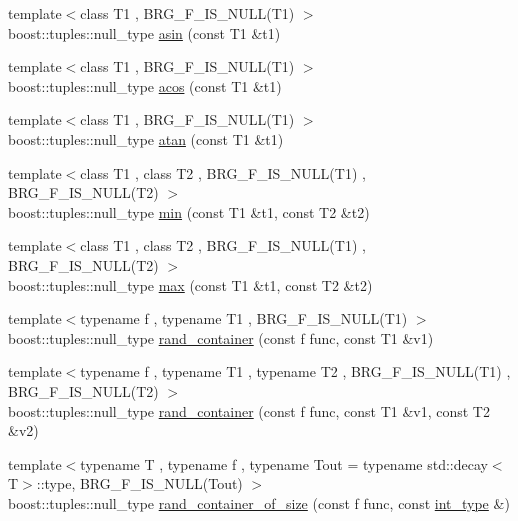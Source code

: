 \begin{DoxyCompactItemize}
\item 
{\footnotesize template$<$class T1 , B\-R\-G\-\_\-\-F\-\_\-\-I\-S\-\_\-\-N\-U\-L\-L(\-T1) $>$ }\\boost\-::tuples\-::null\-\_\-type \hyperlink{namespaceIceBRG_a8c2642e95953da00a32b5b1fe0423c19}{asin} (const T1 \&t1)
\item 
{\footnotesize template$<$class T1 , B\-R\-G\-\_\-\-F\-\_\-\-I\-S\-\_\-\-N\-U\-L\-L(\-T1) $>$ }\\boost\-::tuples\-::null\-\_\-type \hyperlink{namespaceIceBRG_a89e2863517ced5a8dcc69c4eafe765c7}{acos} (const T1 \&t1)
\item 
{\footnotesize template$<$class T1 , B\-R\-G\-\_\-\-F\-\_\-\-I\-S\-\_\-\-N\-U\-L\-L(\-T1) $>$ }\\boost\-::tuples\-::null\-\_\-type \hyperlink{namespaceIceBRG_abcf7b09a39bd6e87b66b81b364b1faf0}{atan} (const T1 \&t1)
\item 
{\footnotesize template$<$class T1 , class T2 , B\-R\-G\-\_\-\-F\-\_\-\-I\-S\-\_\-\-N\-U\-L\-L(\-T1) , B\-R\-G\-\_\-\-F\-\_\-\-I\-S\-\_\-\-N\-U\-L\-L(\-T2) $>$ }\\boost\-::tuples\-::null\-\_\-type \hyperlink{namespaceIceBRG_ad79c6bf9877e0d543cf61a479754e4b6}{min} (const T1 \&t1, const T2 \&t2)
\item 
{\footnotesize template$<$class T1 , class T2 , B\-R\-G\-\_\-\-F\-\_\-\-I\-S\-\_\-\-N\-U\-L\-L(\-T1) , B\-R\-G\-\_\-\-F\-\_\-\-I\-S\-\_\-\-N\-U\-L\-L(\-T2) $>$ }\\boost\-::tuples\-::null\-\_\-type \hyperlink{namespaceIceBRG_a095a1ee68bf6116d22d2e23a2b8bfb9d}{max} (const T1 \&t1, const T2 \&t2)
\item 
{\footnotesize template$<$typename f , typename T1 , B\-R\-G\-\_\-\-F\-\_\-\-I\-S\-\_\-\-N\-U\-L\-L(\-T1) $>$ }\\boost\-::tuples\-::null\-\_\-type \hyperlink{namespaceIceBRG_ab5e5f415466ee5dfe3f6b380655930e2}{rand\-\_\-container} (const f func, const T1 \&v1)
\item 
{\footnotesize template$<$typename f , typename T1 , typename T2 , B\-R\-G\-\_\-\-F\-\_\-\-I\-S\-\_\-\-N\-U\-L\-L(\-T1) , B\-R\-G\-\_\-\-F\-\_\-\-I\-S\-\_\-\-N\-U\-L\-L(\-T2) $>$ }\\boost\-::tuples\-::null\-\_\-type \hyperlink{namespaceIceBRG_a534bd6639bf41e5d23d461dcd793f3a3}{rand\-\_\-container} (const f func, const T1 \&v1, const T2 \&v2)
\item 
{\footnotesize template$<$typename T , typename f , typename Tout  = typename std\-::decay$<$\-T$>$\-::type, B\-R\-G\-\_\-\-F\-\_\-\-I\-S\-\_\-\-N\-U\-L\-L(\-Tout) $>$ }\\boost\-::tuples\-::null\-\_\-type \hyperlink{namespaceIceBRG_a36220fb059d97255a863e2ddb0af3a4c}{rand\-\_\-container\-\_\-of\-\_\-size} (const f func, const \hyperlink{lib_2IceBRG__main_2common_8h_ac4de9d9335536ac22821171deec8d39e}{int\-\_\-type} \&)

\end{DoxyCompactItemize}
